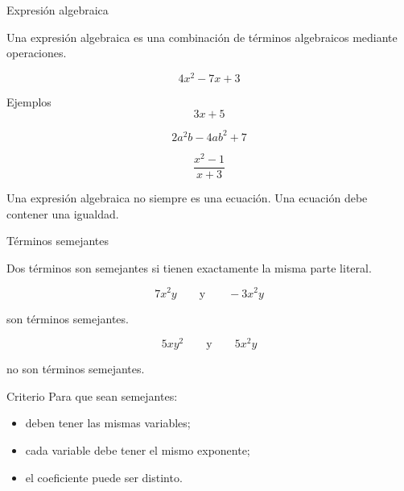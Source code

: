 \documentclass[handout,aspectratio=169]{beamer}
\begin{document}
	\begin{frame}{Expresión algebraica}
		\begin{idea}
			Una expresión algebraica es una combinación de términos algebraicos mediante operaciones.
		\end{idea}
		
		\[
		4x^2-7x+3
		\]
		
		\pause
		
		\begin{block}{Ejemplos}
			\[
			3x+5
			\]
			
			\[
			2a^2b-4ab^2+7
			\]
			
			\[
			\frac{x^2-1}{x+3}
			\]
		\end{block}
		
		\pause
		
		\begin{alerta}
			Una expresión algebraica no siempre es una ecuación.  
			Una ecuación debe contener una igualdad.
		\end{alerta}
	\end{frame}
	
	\begin{frame}{Términos semejantes}
		\begin{idea}
			Dos términos son semejantes si tienen exactamente la misma parte literal.
		\end{idea}
		
		\pause
		
		\[
		7x^2y
		\qquad\text{y}\qquad
		-3x^2y
		\]
		
		son términos semejantes.
		
		\pause
		
		\[
		5xy^2
		\qquad\text{y}\qquad
		5x^2y
		\]
		
		no son términos semejantes.
		
		\pause
		
		\begin{block}{Criterio}
			Para que sean semejantes:
			
			\begin{itemize}
				\item deben tener las mismas variables;
				\item cada variable debe tener el mismo exponente;
				\item el coeficiente puede ser distinto.
			\end{itemize}
		\end{block}
	\end{frame}
	
\end{document}
